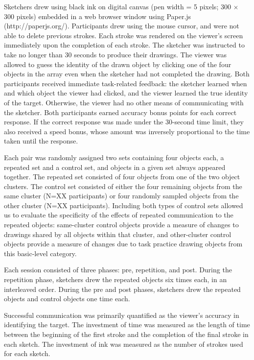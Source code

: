 \documentclass[10pt,letterpaper]{article}
\begin{document}
Sketchers drew using black ink on digital canvas (pen width = 5 pixels; 300 $\times$ 300 pixels) embedded in a web browser window using Paper.js (http://paperjs.org/). Participants drew using the mouse cursor, and were not able to delete previous strokes. Each stroke was rendered on the viewer's screen immediately upon the completion of each stroke. The sketcher was instructed to take no longer than 30 seconds to produce their drawings. The viewer was allowed to guess the identity of the drawn object by clicking one of the four objects in the array even when the sketcher had not completed the drawing. Both participants received immediate task-related feedback: the sketcher learned when and which object the viewer had clicked, and the viewer learned the true identity of the target. Otherwise, the viewer had no other means of communicating with the sketcher. Both participants earned accuracy bonus points for each correct response. If the correct response was made under the 30-second time limit, they also received a speed bonus, whose amount was inversely proportional to the time taken until the response. 

Each pair was randomly assigned two sets containing four objects each, a repeated set and a control set, and objects in a given set always appeared together. 
The repeated set consisted of four objects from one of the two object clusters. 
The control set consisted of either the four remaining objects from the same cluster (N=XX participants) or four randomly sampled objects from the other cluster (N=XX participants).
Including both types of control sets allowed us to evaluate the specificity of the effects of repeated communication to the repeated objects: same-cluster control objects provide a measure of changes to drawings shared by all objects within that cluster, and other-cluster control objects provide a measure of changes due to task practice drawing objects from this basic-level category.

Each session consisted of three phases: pre, repetition, and post. During the repetition phase, sketchers drew the repeated objects six times each, in an interleaved order. During the pre and post phases, sketchers drew the repeated objects and control objects one time each.

Successful communication was primarily quantified as the viewer's accuracy in identifying the target. The investment of time was measured as the length of time between the beginning of the first stroke and the completion of the final stroke in each sketch. The investment of ink was measured as the number of strokes used for each sketch. 
\end{document}
